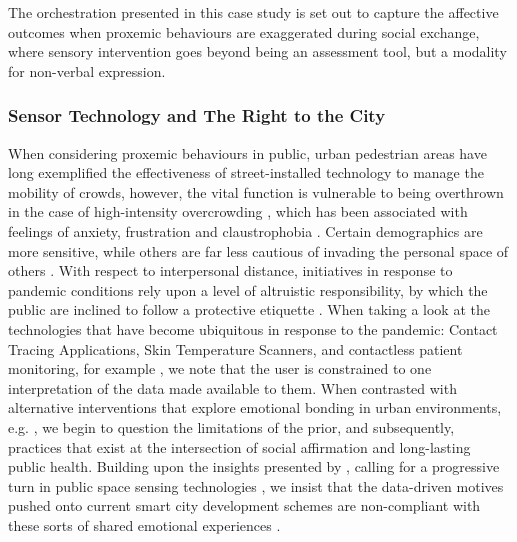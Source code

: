 The orchestration presented in this case study is set out to capture the affective outcomes when proxemic behaviours are exaggerated during social exchange, where sensory intervention goes beyond being an assessment tool, but a modality for non-verbal expression.

\subsubsection{Sensor Technology and The Right to the City}
\label{subsec:shift}

When considering proxemic behaviours in public, urban pedestrian areas have long exemplified the effectiveness of street-installed technology to manage the mobility of crowds, however, the vital function is vulnerable to being overthrown in the case of high-intensity overcrowding \citep{gehl_public_2004,machleit_perceived_2000}, which has been associated with feelings of anxiety, frustration and claustrophobia \citep{kendrick_user_2010}. Certain demographics are more sensitive, while others are far less cautious of invading the personal space of others \citep{peimani_where_2016,remland_interpersonal_1995}. With respect to interpersonal distance, initiatives in response to pandemic conditions rely upon a level of altruistic responsibility, by which the public are inclined to follow a protective etiquette \citep{honey-roses_impact_2020}. When taking a look at the technologies that have become ubiquitous in response to the pandemic: Contact Tracing Applications, Skin Temperature Scanners, and contactless patient monitoring, for example \citep{mehrdad_perspective_2021,taylor_review_2020}, we note that the user is constrained to one interpretation of the data made available to them. When contrasted with alternative interventions that explore emotional bonding in urban environments, e.g. \citep{adhitya_london_2018,gatehouse_feral_2016}, we begin to question the limitations of the prior, and subsequently, practices that exist at the intersection of social affirmation and long-lasting public health. Building upon the insights presented by \citeauthor{howell_life-affirming_2019}, calling for a progressive turn in public space sensing technologies \cite{howell_life-affirming_2019}, we insist that the data-driven motives pushed onto current smart city development schemes are non-compliant with these sorts of shared emotional experiences \citep{battarbee_pools_2002,lange_owning_2013,bueno_smart_2016}.

